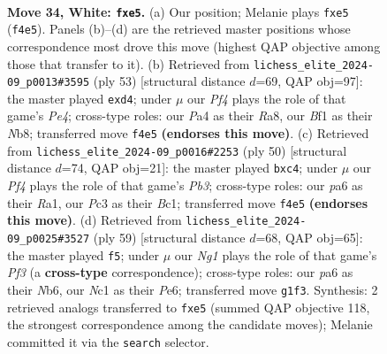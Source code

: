 \documentclass[11pt]{article}
\begin{document}
\clearpage

\begin{figure}[p]\centering
\begin{subfigure}{0.46\textwidth}\centering
\resizebox{\linewidth}{!}{%
\newchessgame
\chessboard[
  setfen={5r2/4r1k1/ppn5/2p1pb2/P4Pp1/2P5/1K4PP/2N1RBNR w - - 0 34},
  showmover=false,
  pgfstyle=straightmove, color=movearrow, markmove={f4-e5}
]}
\caption{}
\end{subfigure}\hfill
\begin{subfigure}{0.46\textwidth}\centering
\resizebox{\linewidth}{!}{%
\newchessgame
\chessboard[
  setfen={rn1r4/pp3kPp/5p1B/4p3/3PP1P1/5P2/P7/2KR1R2 b - - 0 27},
  showmover=false,
  pgfstyle=straightmove, color=movearrow, markmove={e5-d4}
]}
\caption{}
\end{subfigure}
\\[4pt]
\begin{subfigure}{0.46\textwidth}\centering
\resizebox{\linewidth}{!}{%
\newchessgame
\chessboard[
  setfen={3nr3/1pp2k1p/p2b4/6pN/2n1pp2/1PP4P/P4PP1/R1B1R1K1 w - - 0 26},
  showmover=false,
  pgfstyle=straightmove, color=movearrow, markmove={b3-c4}
]}
\caption{}
\end{subfigure}\hfill
\begin{subfigure}{0.46\textwidth}\centering
\resizebox{\linewidth}{!}{%
\newchessgame
\chessboard[
  setfen={3r1b2/pk6/1n2ppb1/7p/3P2p1/1P1B2P1/P1N2PP1/2KR3R b - - 2 30},
  showmover=false,
  pgfstyle=straightmove, color=movearrow, markmove={f6-f5}
]}
\caption{}
\end{subfigure}
\caption{\textbf{Move 34, White: \texttt{fxe5}.} (a) Our position; Melanie plays \texttt{fxe5} (\texttt{f4e5}). Panels (b)--(d) are the retrieved master positions whose correspondence most drove this move (highest QAP objective among those that transfer to it). (b) Retrieved from \texttt{lichess\_elite\_2024-09\_p0013\#3595} (ply 53) [structural distance $d$=69, QAP obj=97]: the master played \texttt{exd4}; under $\mu$ our \emph{Pf4} plays the role of that game's \emph{Pe4}; cross-type roles: our \emph{P}a4 as their \emph{R}a8, our \emph{B}f1 as their \emph{N}b8; transferred move \texttt{f4e5} \textbf{(endorses this move)}. (c) Retrieved from \texttt{lichess\_elite\_2024-09\_p0016\#2253} (ply 50) [structural distance $d$=74, QAP obj=21]: the master played \texttt{bxc4}; under $\mu$ our \emph{Pf4} plays the role of that game's \emph{Pb3}; cross-type roles: our \emph{p}a6 as their \emph{R}a1, our \emph{P}c3 as their \emph{B}c1; transferred move \texttt{f4e5} \textbf{(endorses this move)}. (d) Retrieved from \texttt{lichess\_elite\_2024-09\_p0025\#3527} (ply 59) [structural distance $d$=68, QAP obj=65]: the master played \texttt{f5}; under $\mu$ our \emph{Ng1} plays the role of that game's \emph{Pf3} (a \textbf{cross-type} correspondence); cross-type roles: our \emph{p}a6 as their \emph{N}b6, our \emph{N}c1 as their \emph{P}e6; transferred move \texttt{g1f3}. Synthesis: 2 retrieved analogs transferred to \texttt{fxe5} (summed QAP objective 118, the strongest correspondence among the candidate moves); Melanie committed it via the \texttt{search} selector.}
\label{fig:thought-m66}
\end{figure}
\end{document}
